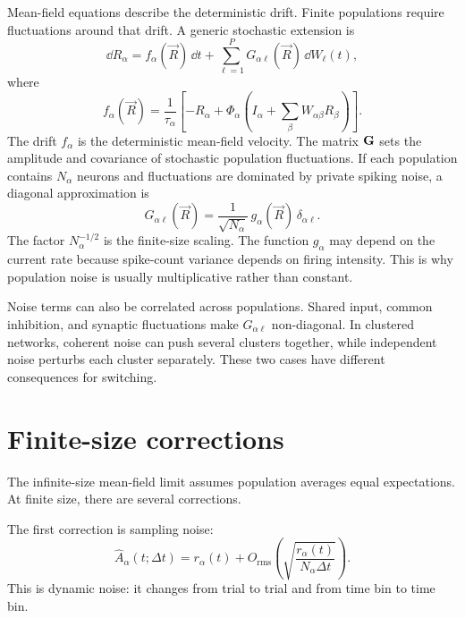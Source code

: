 Mean-field equations describe the deterministic drift. Finite populations require fluctuations around that drift. A generic stochastic extension is
%
\begin{equation}
  \dd R_\alpha
  =
  f_\alpha(\vec R)\,\dd t
  +
  \sum_{\ell=1}^P
  G_{\alpha\ell}(\vec R)\,\dd W_\ell(t),
  \label{eq:mf-stochastic-extension}
\end{equation}
%
where
%
\begin{equation}
  f_\alpha(\vec R)
  =
  \frac{1}{\tau_\alpha}
  \left[
    -R_\alpha
    +
    \Phi_\alpha\!\left(I_\alpha+\sum_\beta W_{\alpha\beta}R_\beta\right)
  \right].
  \label{eq:mf-drift}
\end{equation}
%
The drift $f_\alpha$ is the deterministic mean-field velocity. The matrix $\mathbf{G}$ sets the amplitude and covariance of stochastic population fluctuations. If each population contains $N_\alpha$ neurons and fluctuations are dominated by private spiking noise, a diagonal approximation is
%
\begin{equation}
  G_{\alpha\ell}(\vec R)
  =
  \frac{1}{\sqrt{N_\alpha}}\,
  g_\alpha(\vec R)\,
  \delta_{\alpha\ell}.
  \label{eq:diagonal-population-noise}
\end{equation}
%
The factor $N_\alpha^{-1/2}$ is the finite-size scaling. The function $g_\alpha$ may depend on the current rate because spike-count variance depends on firing intensity. This is why population noise is usually multiplicative rather than constant.

Noise terms can also be correlated across populations. Shared input, common inhibition, and synaptic fluctuations make $G_{\alpha\ell}$ non-diagonal. In clustered networks, coherent noise can push several clusters together, while independent noise perturbs each cluster separately. These two cases have different consequences for switching.

\section{Finite-size corrections}
\label{sec:finite-size-corrections-mean-field}

The infinite-size mean-field limit assumes population averages equal expectations. At finite size, there are several corrections.

The first correction is sampling noise:
%
\begin{equation}
  \widehat A_\alpha(t;\Delta t)
  =
  r_\alpha(t)
  +
  O_{\mathrm{rms}}\!\left(
    \sqrt{\frac{r_\alpha(t)}{N_\alpha\Delta t}}
  \right).
  \label{eq:finite-size-sampling-correction}
\end{equation}
%
This is dynamic noise: it changes from trial to trial and from time bin to time bin.

